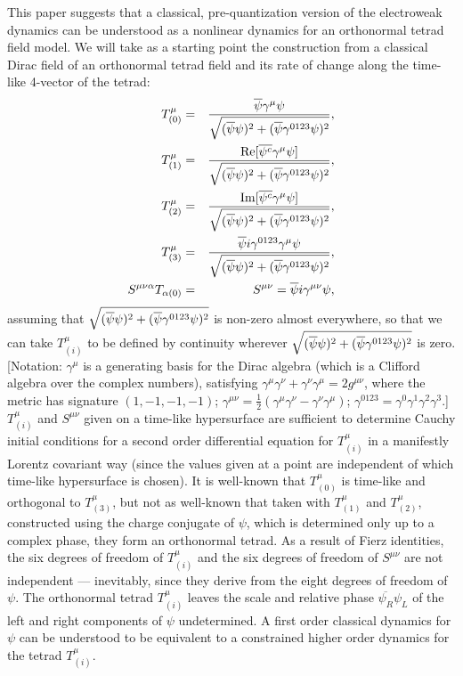 \documentclass[a4paper,twocolumn,showpacs,preprintnumbers,aps]{revtex4}
\begin{document}
This paper suggests that a classical, pre-quantization version of the
electroweak dynamics can be understood as a nonlinear dynamics
for an orthonormal tetrad field model. We will take as a starting point
the construction from a classical Dirac field of an orthonormal tetrad
field and its rate of change along the time-like 4-vector of the tetrad:
\begin{eqnarray*}
    T^\mu_{(0)}&=&\frac{\overline{\psi}\gamma^\mu\psi}{{\sqrt{(\overline{\psi}\psi)^2+(\overline{\psi}\gamma^{0123}\psi)^2}}},\cr
    T^\mu_{(1)}&=&\frac{\mathrm{Re}[\overline{\psi^c}\gamma^\mu\psi]}{{\sqrt{(\overline{\psi}\psi)^2+(\overline{\psi}\gamma^{0123}\psi)^2}}},\cr
    T^\mu_{(2)}&=&\frac{\mathrm{Im}[\overline{\psi^c}\gamma^\mu\psi]}{{\sqrt{(\overline{\psi}\psi)^2+(\overline{\psi}\gamma^{0123}\psi)^2}}},\cr
    T^\mu_{(3)}&=&\frac{\overline{\psi}i\gamma^{0123}\gamma^\mu\psi}{{\sqrt{(\overline{\psi}\psi)^2+(\overline{\psi}\gamma^{0123}\psi)^2}}},\cr
    S^{\mu\nu\alpha}T_{\alpha(0)}&=&S^{\mu\nu}=\overline{\psi}i\gamma^{\mu\nu}\psi,
\end{eqnarray*}
assuming that ${\sqrt{(\overline{\psi}\psi)^2+(\overline{\psi}\gamma^{0123}\psi)^2}}$ is non-zero almost everywhere, so that we can take
$T^\mu_{(i)}$ to be defined by continuity wherever ${\sqrt{(\overline{\psi}\psi)^2+(\overline{\psi}\gamma^{0123}\psi)^2}}$ is zero.
{[Notation: $\gamma^\mu$ is a generating basis for the Dirac algebra (which is a Clifford
algebra over the complex numbers), satisfying
$\gamma^\mu\gamma^\nu+\gamma^\nu\gamma^\mu=2g^{\mu\nu}$, where the metric
has signature $(1,-1,-1,-1)$;
$\gamma^{\mu\nu}=\frac{1}{2}(\gamma^\mu\gamma^\nu-\gamma^\nu\gamma^\mu)$;
$\gamma^{0123}=\gamma^0\gamma^1\gamma^2\gamma^3$.]}
$T^\mu_{(i)}$ and $S^{\mu\nu}$ given on a time-like hypersurface are sufficient
to determine Cauchy initial conditions for a second order differential equation for
$T^\mu_{(i)}$ in a manifestly Lorentz covariant way (since the values given at
a point are independent of which time-like hypersurface is chosen).
It is well-known that $T^\mu_{(0)}$ is time-like and orthogonal to $T^\mu_{(3)}$, but not
as well-known that taken with $T^\mu_{(1)}$ and $T^\mu_{(2)}$, constructed using
the charge conjugate of $\psi$, which is determined only up to a complex phase, they
form an orthonormal tetrad. As a result of Fierz identities, the six degrees of freedom
of $T^\mu_{(i)}$ and the six degrees of freedom of $S^{\mu\nu}$ are not independent
--- inevitably, since they derive from the eight degrees of freedom of $\psi$. The
orthonormal tetrad $T^\mu_{(i)}$ leaves the scale and relative phase
$\overline{\psi_R}\psi_L$ of the left and right components of $\psi$ undetermined.
A first order classical dynamics for $\psi$ can be understood to be equivalent to a
constrained higher order dynamics for the tetrad $T^\mu_{(i)}$.
\end{document}
